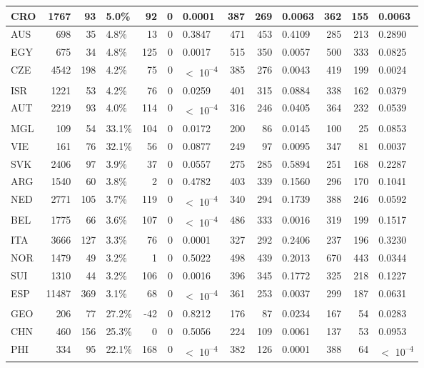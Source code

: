 \begin{tabular}{l|r|r|l|r|r|l|r|r|l|r|r|l}
\hline
CRO & 1767 & 93 & 5.0\% & 92 & 0 & 0.0001 & 387 & 269 & 0.0063 & 362 & 155 & 0.0063\\
\hline
AUS & 698 & 35 & 4.8\% & 13 & 0 & 0.3847 & 471 & 453 & 0.4109 & 285 & 213 & 0.2890\\
\hline
EGY & 675 & 34 & 4.8\% & 125 & 0 & 0.0017 & 515 & 350 & 0.0057 & 500 & 333 & 0.0825\\
\hline
CZE & 4542 & 198 & 4.2\% & 75 & 0 & $<$ 10\textsuperscript{--4} & 385 & 276 & 0.0043 & 419 & 199 & 0.0024\\
\hline
ISR & 1221 & 53 & 4.2\% & 76 & 0 & 0.0259 & 401 & 315 & 0.0884 & 338 & 162 & 0.0379\\
\hline
AUT & 2219 & 93 & 4.0\% & 114 & 0 & $<$ 10\textsuperscript{--4} & 316 & 246 & 0.0405 & 364 & 232 & 0.0539\\
\hline
MGL & 109 & 54 & 33.1\% & 104 & 0 & 0.0172 & 200 & 86 & 0.0145 & 100 & 25 & 0.0853\\
\hline
VIE & 161 & 76 & 32.1\% & 56 & 0 & 0.0877 & 249 & 97 & 0.0095 & 347 & 81 & 0.0037\\
\hline
SVK & 2406 & 97 & 3.9\% & 37 & 0 & 0.0557 & 275 & 285 & 0.5894 & 251 & 168 & 0.2287\\
\hline
ARG & 1540 & 60 & 3.8\% & 2 & 0 & 0.4782 & 403 & 339 & 0.1560 & 296 & 170 & 0.1041\\
\hline
NED & 2771 & 105 & 3.7\% & 119 & 0 & $<$ 10\textsuperscript{--4} & 340 & 294 & 0.1739 & 388 & 246 & 0.0592\\
\hline
BEL & 1775 & 66 & 3.6\% & 107 & 0 & $<$ 10\textsuperscript{--4} & 486 & 333 & 0.0016 & 319 & 199 & 0.1517\\
\hline
ITA & 3666 & 127 & 3.3\% & 76 & 0 & 0.0001 & 327 & 292 & 0.2406 & 237 & 196 & 0.3230\\
\hline
NOR & 1479 & 49 & 3.2\% & 1 & 0 & 0.5022 & 498 & 439 & 0.2013 & 670 & 443 & 0.0344\\
\hline
SUI & 1310 & 44 & 3.2\% & 106 & 0 & 0.0016 & 396 & 345 & 0.1772 & 325 & 218 & 0.1227\\
\hline
ESP & 11487 & 369 & 3.1\% & 68 & 0 & $<$ 10\textsuperscript{--4} & 361 & 253 & 0.0037 & 299 & 187 & 0.0631\\
\hline
GEO & 206 & 77 & 27.2\% & -42 & 0 & 0.8212 & 176 & 87 & 0.0234 & 167 & 54 & 0.0283\\
\hline
CHN & 460 & 156 & 25.3\% & 0 & 0 & 0.5056 & 224 & 109 & 0.0061 & 137 & 53 & 0.0953\\
\hline
PHI & 334 & 95 & 22.1\% & 168 & 0 & $<$ 10\textsuperscript{--4} & 382 & 126 & 0.0001 & 388 & 64 & $<$ 10\textsuperscript{--4}\\

\end{tabular}
